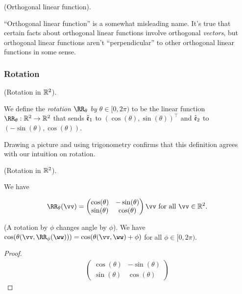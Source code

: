 \begin{remark}
    (Orthogonal linear function).
    
    ``Orthogonal linear function'' is a somewhat misleading name. It's true that certain facts about orthogonal linear functions involve orthogonal \textit{vectors}, but orthogonal linear functions aren't ``perpendicular'' to other orthogonal linear functions in some sense.
\end{remark}

\subsubsection*{Rotation}

\begin{defn}
    (Rotation in $\mathbb{R}^2$).

    We define the \textit{rotation $\RR_\theta$ by $\theta \in [0, 2\pi)$} to be the linear function $\RR_\theta:\R^2 \rightarrow \R^2$ that sends $\hat{\mathfrak{e}}_1$ to $(\cos(\theta), \sin(\theta))^\top$ and $\hat{\mathfrak{e}}_2$ to $(-\sin(\theta), \cos(\theta))$.
\end{defn}

Drawing a picture and using trigonometry confirms that this definition agrees with our intuition on rotation.

\begin{theorem}
    (Rotation in $\mathbb{R}^2$).

    We have

    \begin{align*}
        \RR_\theta(\vv) =
        \begin{pmatrix}
            \cos(\theta) & -\sin(\theta) \\
            \sin(\theta) & \cos(\theta)
        \end{pmatrix}
        \vv
        \text{ for all $\vv \in \R^2$}.
    \end{align*}
\end{theorem}

\begin{theorem}
    (A rotation by $\phi$ changes angle by $\phi$). We have $\cos(\theta(\vv, \RR_\phi(\ww))) = \cos(\theta(\vv, \ww) + \phi)$ for all $\phi \in [0, 2\pi)$.
\end{theorem}

\begin{proof}
    \begin{align*}
        \begin{pmatrix}
            \cos(\theta) & -\sin(\theta) \\
            \sin(\theta) & \cos(\theta)
        \end{pmatrix}
    \end{align*}
\end{proof}


